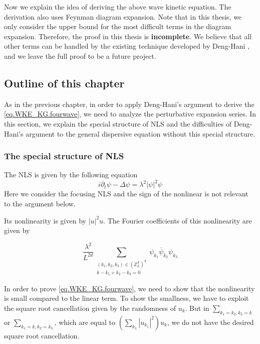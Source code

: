 Now we explain the idea of deriving the above wave kinetic equation. The derivation also uses Feynman diagram expansion. Note that in this thesis, we only consider the upper bound for the most difficult terms in the diagram expansion. Therefore, the proof in this thesis is \textbf{incomplete}. We believe that all other terms can be handled by the existing technique developed by Deng-Hani \cite{deng2021full}, \cite{deng2023derivation} and we leave the full proof to be a future project.





\subsection{Outline of this chapter} As in the previous chapter, in order to apply Deng-Hani's argument to derive the \eqref{eq.WKE_KG.fourwave}, we need to analyze the perturbative expansion series. In this section, we explain the special structure of NLS and the difficulties of Deng-Hani's argument to the general dispersive equation without this special structure. 

\subsubsection{The special structure of NLS}\label{sec.specialintro.fourwave} The NLS is given by the following equation
\begin{equation}
 i\partial_t\psi-\Delta\psi=\lambda^2 |\psi|^2\psi
\end{equation}
Here we consider the focusing NLS and the sign of the nonlinear is not relevant to the argument below.

Its nonlinearity is given by $|u|^2u$. The Fourier coefficients of this nonlinearity are given by

\begin{equation}
 \frac{\lambda^2}{L^{2d}} \sum\limits_{\substack{(k_1,k_2,k_{3}) \in (\mathbb{Z}^d_L)^3 \\ k - k_1 + k_2 -k_3 = 0}} \psi_{k_1}\overline{\psi}_{k_2} \psi_{k_3}
\end{equation}

In order to prove \eqref{eq.WKE_KG.fourwave}, we need to show that the nonlinearity is small compared to the linear term. To show the smallness, we have to exploit the square root cancellation given by the randomness of $u_k$.
But in $\sum_{k_1=k_2,k_3=k}$ or $\sum_{k_1=k,k_2=k_3}$, which are equal to $ (\sum_{k_1}|u_{k_1}|^2) u_k$, we do not have the desired square root cancellation.

